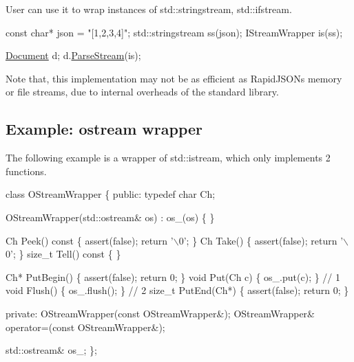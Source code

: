 User can use it to wrap instances of {\ttfamily std\+::stringstream}, {\ttfamily std\+::ifstream}.


\begin{DoxyCode}
\textcolor{keyword}{const} \textcolor{keywordtype}{char}* json = \textcolor{stringliteral}{"[1,2,3,4]"};
std::stringstream ss(json);
IStreamWrapper is(ss);

\hyperlink{class_generic_document}{Document} d;
d.\hyperlink{class_generic_document_afe94c0abc83a20f2d7dc1ba7677e6238}{ParseStream}(is);
\end{DoxyCode}


Note that, this implementation may not be as efficient as Rapid\+J\+S\+ON\textquotesingle{}s memory or file streams, due to internal overheads of the standard library.\hypertarget{md_Commun_Externe_RapidJSON_doc_stream.zh-cn_ExampleOStreamWrapper}{}\subsection{Example\+: ostream wrapper}\label{md_Commun_Externe_RapidJSON_doc_stream.zh-cn_ExampleOStreamWrapper}
The following example is a wrapper of {\ttfamily std\+::istream}, which only implements 2 functions.


\begin{DoxyCode}
\textcolor{keyword}{class }OStreamWrapper \{
\textcolor{keyword}{public}:
    \textcolor{keyword}{typedef} \textcolor{keywordtype}{char} Ch;

    OStreamWrapper(std::ostream& os) : os\_(os) \{
    \}

    Ch Peek()\textcolor{keyword}{ const }\{ assert(\textcolor{keyword}{false}); \textcolor{keywordflow}{return} \textcolor{charliteral}{'\(\backslash\)0'}; \}
    Ch Take() \{ assert(\textcolor{keyword}{false}); \textcolor{keywordflow}{return} \textcolor{charliteral}{'\(\backslash\)0'}; \}
    \textcolor{keywordtype}{size\_t} Tell()\textcolor{keyword}{ const }\{  \}

    Ch* PutBegin() \{ assert(\textcolor{keyword}{false}); \textcolor{keywordflow}{return} 0; \}
    \textcolor{keywordtype}{void} Put(Ch c) \{ os\_.put(c); \}                  \textcolor{comment}{// 1}
    \textcolor{keywordtype}{void} Flush() \{ os\_.flush(); \}                   \textcolor{comment}{// 2}
    \textcolor{keywordtype}{size\_t} PutEnd(Ch*) \{ assert(\textcolor{keyword}{false}); \textcolor{keywordflow}{return} 0; \}

\textcolor{keyword}{private}:
    OStreamWrapper(\textcolor{keyword}{const} OStreamWrapper&);
    OStreamWrapper& operator=(\textcolor{keyword}{const} OStreamWrapper&);

    std::ostream& os\_;
\};
\end{DoxyCode}


